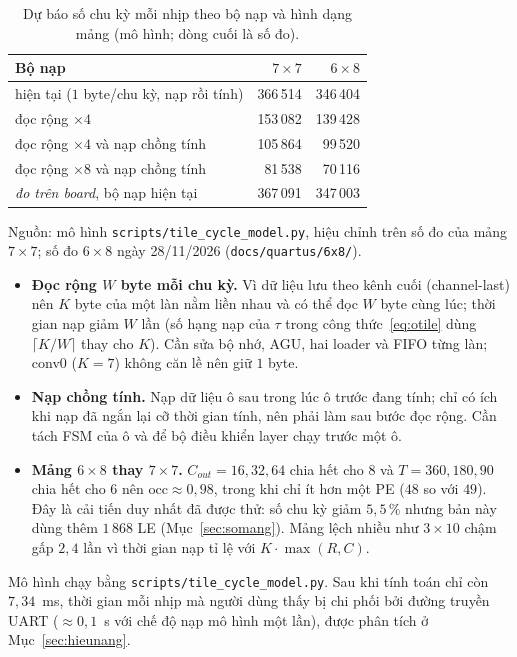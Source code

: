 \begin{table}[htbp]\centering
\caption{Dự báo số chu kỳ mỗi nhịp theo bộ nạp và hình dạng mảng (mô hình; dòng cuối là số đo).}\label{tab:duBao}
\small
\begin{tabular}{@{}lrr@{}}
\toprule
Bộ nạp & $7\times7$ & $6\times8$ \\ \midrule
hiện tại ($1$ byte/chu kỳ, nạp rồi tính) & 366\,514 & 346\,404 \\
đọc rộng $\times4$ & 153\,082 & 139\,428 \\
đọc rộng $\times4$ và nạp chồng tính & 105\,864 & 99\,520 \\
đọc rộng $\times8$ và nạp chồng tính & 81\,538 & 70\,116 \\ \midrule
\emph{đo trên board}, bộ nạp hiện tại & 367\,091 & 347\,003 \\ \bottomrule
\end{tabular}

\smallskip
\footnotesize Nguồn: mô hình \texttt{scripts/tile\_cycle\_model.py}, hiệu chỉnh trên số đo của mảng $7\times7$; số đo $6\times8$ ngày 28/11/2026 (\texttt{docs/quartus/6x8/}).
\end{table}

\begin{itemize}
  \item \textbf{Đọc rộng $W$ byte mỗi chu kỳ.} Vì dữ liệu lưu theo kênh cuối (channel-last) nên $K$ byte của một làn nằm liền nhau và có thể đọc $W$ byte cùng lúc; thời gian nạp giảm $W$ lần (số hạng nạp của $\tau$ trong công thức~\eqref{eq:otile} dùng $\lceil K/W\rceil$ thay cho $K$).
  Cần sửa bộ nhớ, AGU, hai loader và FIFO từng làn; conv0 ($K=7$) không căn lề nên giữ $1$ byte.
  \item \textbf{Nạp chồng tính.} Nạp dữ liệu ô sau trong lúc ô trước đang tính; chỉ có ích khi nạp đã ngắn lại cỡ thời gian tính, nên phải làm sau bước đọc rộng.
  Cần tách FSM của ô và để bộ điều khiển layer chạy trước một ô.
  \item \textbf{Mảng $6\times8$ thay $7\times7$.} $C_{out}=16,32,64$ chia hết cho $8$ và $T=360,180,90$ chia hết cho $6$ nên $\mathrm{occ}\approx0{,}98$, trong khi chỉ ít hơn một PE ($48$ so với $49$).
  Đây là cải tiến duy nhất đã được thử: số chu kỳ giảm $5{,}5\,\%$ nhưng bản này dùng thêm $1\,868$ LE (Mục~\ref{sec:somang}).
  Mảng lệch nhiều như $3\times10$ chậm gấp $2{,}4$ lần vì thời gian nạp tỉ lệ với $K\cdot\max(R,C)$.
\end{itemize}
Mô hình chạy bằng \texttt{scripts/tile\_cycle\_model.py}.
Sau khi tính toán chỉ còn $7{,}34$~ms, thời gian mỗi nhịp mà người dùng thấy bị chi phối bởi đường truyền UART ($\approx0{,}1$~s với chế độ nạp mô hình một lần), được phân tích ở Mục~\ref{sec:hieunang}.
